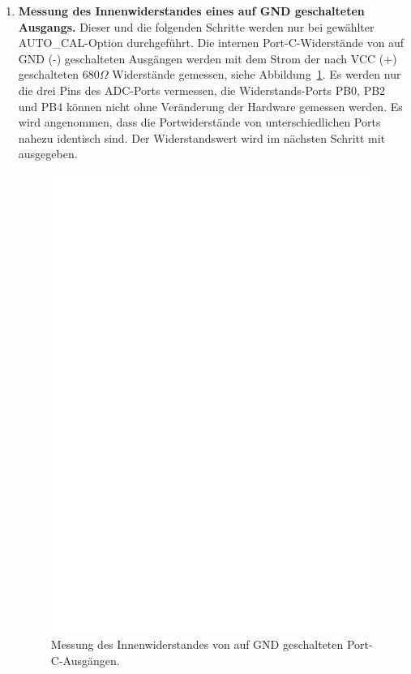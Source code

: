 \begin{enumerate}
\item {\bf Messung des Innenwiderstandes eines auf GND geschalteten Ausgangs.}
Dieser und die folgenden Schritte werden nur bei gewählter AUTO\_CAL-Option durchgeführt.
Die internen Port-C-Widerstände von auf GND (-) geschalteten Ausgängen werden mit dem Strom
der nach VCC (+) geschalteten \(680\Omega\) Widerstände gemessen, siehe Abbildung~\ref{fig:test7}.
Es werden nur die drei Pins des ADC-Ports vermessen, die Widerstands-Ports  PB0, PB2 und PB4 können nicht
ohne Veränderung der Hardware gemessen werden.
Es wird angenommen, dass die Portwiderstände von unterschiedlichen Ports nahezu identisch sind.
Der Widerstandswert wird im nächsten Schritt mit ausgegeben.
\begin{figure}[H]
\centering
\includegraphics[]{../FIG/Test7.eps}
\caption{Messung des Innenwiderstandes von auf GND geschalteten Port-C-Ausgängen.}
\label{fig:test7}
\end{figure}


\end{enumerate}
